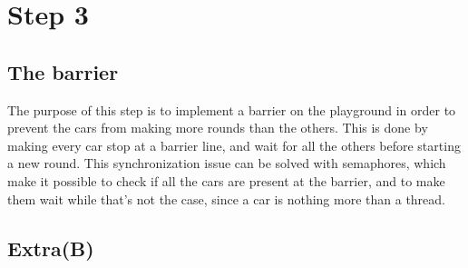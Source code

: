 
\section{Step 3}
\subsection{The barrier} %

The purpose of this step is to implement a barrier on the playground in order to prevent the cars from making more rounds than the others. This is done by making every car stop at a barrier line, and wait for all the others before starting a new round. This synchronization issue can be solved with semaphores, which make it possible to check if all the cars are present at the barrier, and to make them wait while that's not the case, since a car is nothing more than a thread.



\subsection{Extra(B)}
